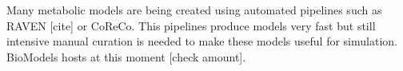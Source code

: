 Many metabolic models are being created using automated pipelines such as RAVEN [cite] or CoReCo. This pipelines produce models very fast but still intensive manual curation is needed to make these models useful for simulation. BioModels hosts at this moment [check amount].